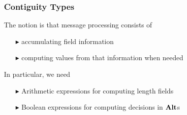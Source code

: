 \documentclass{beamer}
\newcommand{\konst}[1]{\ensuremath{\mbox{\bf{#1}}}}
\begin{document}



\begin{frame}[fragile]\frametitle{Contiguity Types}

The notion is that message processing consists of

\begin{itemize}
\item [$\blacktriangleright$] accumulating field information
\item [$\blacktriangleright$] computing values from that information when needed
\end{itemize}

In particular, we need

\begin{itemize}
\item [$\blacktriangleright$] Arithmetic expressions for computing length fields
\item [$\blacktriangleright$] Boolean expressions for computing decisions in \konst{Alt}s
\end{itemize}

\end{frame}
\end{document}
